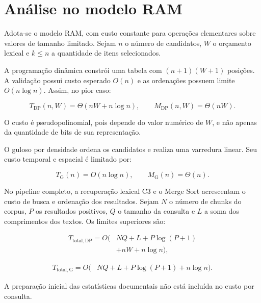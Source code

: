 \documentclass[11pt,a4paper]{article}
\theoremstyle{plain}
\theoremstyle{definition}
\theoremstyle{plain}
\begin{document}
\section{Análise no modelo RAM}

Adota-se o modelo RAM, com custo constante
para operações elementares sobre valores
de tamanho limitado. Sejam $n$ o número
de candidatos, $W$ o orçamento lexical
e $k\leq n$ a quantidade de itens selecionados.

A programação dinâmica constrói uma tabela
com $(n+1)(W+1)$ posições. A validação
possui custo esperado $O(n)$ e as ordenações
possuem limite $O(n\log n)$. Assim, no
pior caso:

\begin{equation}
T_{\mathrm{DP}}(n,W)
=\Theta(nW+n\log n),
\qquad
M_{\mathrm{DP}}(n,W)=\Theta(nW).
\end{equation}

O custo é pseudopolinomial, pois depende
do valor numérico de $W$, e não apenas
da quantidade de bits de sua representação.

O guloso por densidade ordena os candidatos
e realiza uma varredura linear. Seu custo
temporal e espacial é limitado por:

\begin{equation}
T_{\mathrm{G}}(n)=O(n\log n),
\qquad
M_{\mathrm{G}}(n)=\Theta(n).
\end{equation}

No pipeline completo, a recuperação lexical
C3 e o Merge Sort acrescentam o custo de
busca e ordenação dos resultados. Sejam
$N$ o número de chunks do corpus,
$P$ os resultados positivos, $Q$ o tamanho
da consulta e $L$ a soma dos comprimentos
dos textos. Os limites superiores são:

\begin{equation}
\begin{aligned}
T_{\mathrm{total,DP}}=O(&NQ+L+
P\log(P+1)\\
&+nW+n\log n),
\end{aligned}
\end{equation}

\begin{equation}
\begin{aligned}
T_{\mathrm{total,G}}=O(&NQ+L+
P\log(P+1)+n\log n).
\end{aligned}
\end{equation}

A preparação inicial das estatísticas
documentais não está incluída no custo
por consulta.
\end{document}
